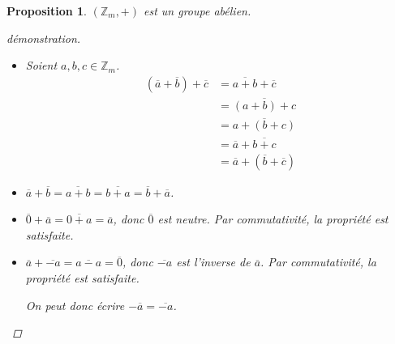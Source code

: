 \documentclass{report}
\newcommand*{\entiers}{\mathbb{Z}}
\newtheorem*{prop}{Proposition}
\theoremstyle{definition}
\theoremstyle{remark}
\begin{document}
	\begin{prop}
		$(\entiers_m,+)$ est un groupe ab\'elien.
		\begin{proof}[d\'emonstration]~

			\begin{itemize}
				\item[(A)] Soient $a,b,c \in \entiers_m$.
				\begin{align*}
					\left( \overline{a} + \overline{b} \right) + \overline{c}&= \overline{a+b} + \overline{c}\\
					&= \overline{(a+b)+c}\\
					&= \overline{a+(b+c)}\\
					&= \overline{a} + \overline{b+c}\\
					&= \overline{a} + \left( \overline{b} + \overline{c} \right)
				\end{align*}
				\item[(C)] $\overline{a} + \overline{b} = \overline{a+b} = \overline{b+a} = \overline{b} + \overline{a}$.
				\item[(N)] $\overline{0} + \overline{a} = \overline{0+a} = \overline{a}$, donc $\overline{0}$ est neutre. Par commutativit\'e, la propri\'et\'e est satisfaite.
				\item[(I)] $\overline{a} + \overline{-a} = \overline{a-a} = \overline{0}$, donc $\overline{-a}$ est l'inverse de $\overline{a}$. Par commutativit\'e, la propri\'et\'e est satisfaite.

				On peut donc \'ecrire $-\overline{a} = \overline{-a}$.
			\end{itemize}
		\end{proof}
	\end{prop}
\end{document}
